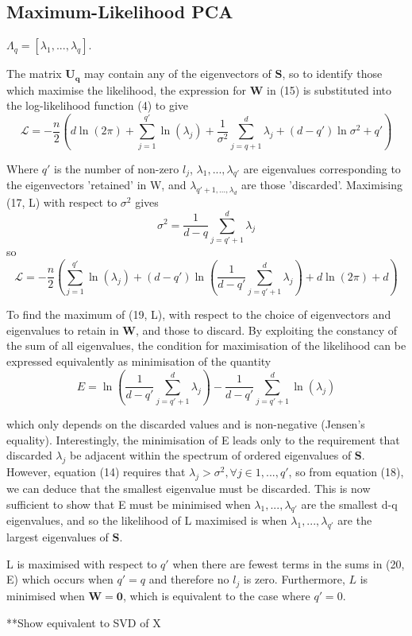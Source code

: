 \documentclass[ %
                    author={Dillon Keith Diep [INCOMPLETE DRAFT, NOT FOR SUBMISSION]},
                supervisor={Dr. Carl Henrik Ek},
                    degree={MEng},
                     title={ART-CG:},
                  subtitle={Assisted Real-Time Content Generation of 3D Hair Geometry},
                      type={Research},
                      year={2014} ]{dissertation}
\begin{document}
\subsection{Maximum-Likelihood PCA}
{ \color{red}
 $\Lambda_q=[ \lambda_1,...,\lambda_q ]$.

The matrix $\mathbf{U_q}$ may contain any of the eigenvectors of $\mathbf{S}$, so to identify those which maximise the likelihood, the expression for $\mathbf{W}$ in (15) is substituted into the log-likelihood function (4) to give 
$$\mathcal{L}=-\frac{n}{2} ( d\ln(2\pi)+\sum^{q'}_{j=1}\ln(\lambda_j)+\frac{1}{\sigma^2}\sum^d_{j=q+1}\lambda_j+(d-q')\ln\sigma^2+q' )$$

Where $q'$ is the number of non-zero $l_j$, $\lambda_1,...,\lambda_{q'}$ are eigenvalues corresponding to the eigenvectors 'retained' in W, and $\lambda_{q'+1,...,\lambda_d}$ are those 'discarded'. Maximising (17, L) with respect to $\sigma^2$ gives
$$\sigma^2=\frac{1}{d-q}\sum^d_{j=q'+1}\lambda_j$$
so
$$\mathcal{L}=-\frac{n}{2}( \sum^{q'}_{j=1}\ln(\lambda_j)+(d-q')\ln( \frac{1}{d-q'}\sum^d_{j=q'+1}\lambda_j ) +d\ln(2\pi)+d )$$

To find the maximum of (19, L), with respect to the choice of eigenvectors and eigenvalues to retain in $\mathbf{W}$, and those to discard.
By exploiting the constancy of the sum of all eigenvalues, the condition for maximisation of the likelihood can be expressed equivalently as minimisation of the quantity
$$E=\ln(\frac{1}{d-q'}\sum^d_{j=q'+1}\lambda_j)-\frac{1}{d-q'}\sum^d_{j=q'+1}\ln(\lambda_j)$$

which only depends on the discarded values and is non-negative (Jensen's equality). Interestingly, the minimisation of E leads only to the requirement that discarded $\lambda_j$ be adjacent within the spectrum of ordered eigenvalues of $\mathbf{S}$. However, equation (14) requires that $\lambda_j > \sigma^2, \forall j \in {1,...,q'}$, so from equation (18), we can deduce that the smallest eigenvalue must be discarded. This is now sufficient to show that E must be minimised when $\lambda_1,...,\lambda_{q'}$ are the smallest d-q eigenvalues, and so the likelihood of L maximised is when $\lambda_1,...,\lambda_{q'}$ are the largest eigenvalues of $\mathbf{S}$.

L is maximised with respect to $q'$ when there are fewest terms in the sums in (20, E) which occurs when $q'=q$ and therefore no $l_j$ is zero. Furthermore, $L$ is minimised when $\mathbf{W=0}$, which is equivalent to the case where $q'=0$.

**Show equivalent to SVD of X
}
\end{document}
